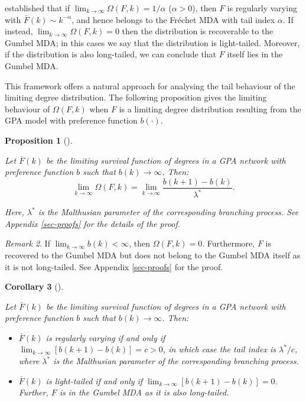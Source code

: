 \documentclass[
  sn-basic,
  10pt,
]{sn-jnl}
\theoremstyle{thmstyleone}
\newtheorem{proposition}{Proposition}[section]
\theoremstyle{thmstyleone}
\newtheorem{corollary}[proposition]{Corollary}
\theoremstyle{remark}
\newtheorem{refremark}[proposition]{Remark}
\theoremstyle{plain}
\theoremstyle{plain}
\theoremstyle{remark}
\begin{document}
\citet{shimura12} established that if
\(\lim_{k\rightarrow\infty} \Omega(F,k) = 1/\alpha\) (\(\alpha>0\)),
then \(F\) is regularly varying with \(\bar F(k) \sim k^{-\alpha}\), and
hence belongs to the Fréchet MDA with tail index \(\alpha\). If instead,
\(\lim_{k\rightarrow\infty} \Omega(F,k) = 0\) then the distribution is
recoverable to the Gumbel MDA; in this cases we say that the
distribution is light-tailed. Moreover, if the distribution is also
long-tailed, we can conclude that \(F\) itself lies in the Gumbel MDA.

This framework offers a natural approach for analysing the tail
behaviour of the limiting degree distribution. The following proposition
gives the limiting behaviour of \(\Omega(F,k)\) when \(F\) is a limiting
degree distribution resulting from the GPA model with preference
function \(b(\cdot)\).

\begin{proposition}[]\protect\hypertarget{prp-omega}{}\label{prp-omega}

Let \(\bar F (k)\) be the limiting survival function of degrees in a GPA
network with preference function \(b\) such that
\(b(k)\rightarrow\infty\). Then: \[
\lim_{k\rightarrow\infty}\Omega(F,k) = \lim_{k\rightarrow\infty}\frac{b(k+1)-b(k)}{\lambda^*}.
\]

Here, \(\lambda^*\) is the Malthusian parameter of the corresponding
branching process. See Appendix \ref{sec-proofs} for the details of the
proof.

\end{proposition}

\begin{refremark}
If \(\lim_{k\rightarrow\infty}b(k)<\infty\), then \(\Omega(F, k) = 0\).
Furthermore, \(F\) is recovered to the Gumbel MDA but does not belong to
the Gumbel MDA itself as it is not long-tailed. See Appendix
\ref{sec-proofs} for the proof.

\label{rem-omega}

\end{refremark}

\begin{corollary}[]\protect\hypertarget{cor-omega2}{}\label{cor-omega2}

Let \(\bar F (k)\) be the limiting survival function of degrees in a GPA
network with preference function \(b\) such that
\(b(k)\rightarrow\infty\). Then:

\begin{itemize}
\item
  \(\bar F(k)\) is regularly varying if and only if
  \(\lim_{k\rightarrow\infty}[b(k+1)-b(k)]=c>0\), in which case the tail
  index is \(\lambda^*/c\), where \(\lambda^*\) is the Malthusian
  parameter of the corresponding branching process.
\item
  \(\bar F(k)\) is light-tailed if and only if
  \(\lim_{k\rightarrow\infty}[b(k+1)-b(k)]=0\). Further, \(F\) is in the
  Gumbel MDA as it is also long-tailed.
\end{itemize}

\end{corollary}
\end{document}
